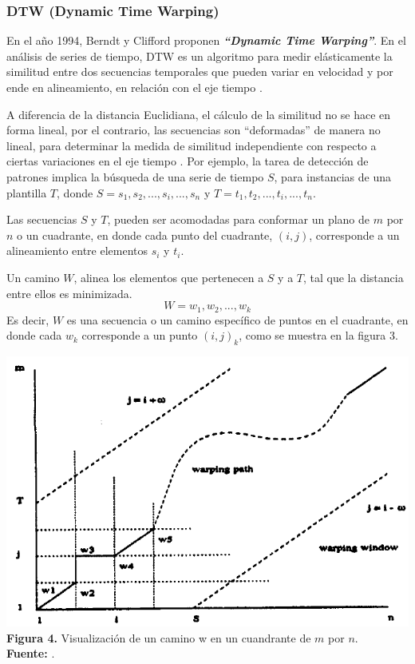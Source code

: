\subsubsection{DTW (Dynamic Time Warping)}
En el a\~no 1994, Berndt y Clifford \cite{dtw} proponen \textit{\textbf{\enquote{Dynamic Time Warping}}}. En el an\'alisis de series de tiempo, DTW es un algoritmo para medir el\'asticamente la similitud entre dos secuencias temporales que pueden variar en velocidad y por ende en alineamiento, en relaci\'on con el eje tiempo \cite{concepts}.\par A diferencia de la distancia Euclidiana, el c\'alculo de la similitud no se hace en forma lineal, por el contrario, las secuencias son \enquote{deformadas} de manera no li\-neal, para determinar la medida de similitud independiente con respecto a ciertas variaciones en el eje tiempo \cite{dtw}. Por ejemplo, la tarea de detecci\'on de patrones implica la b\'usqueda de una serie de tiempo $S$, para instancias de una plantilla $T$, donde $S = s_1, s_2, ..., s_i, ..., s_n$ y $T = t_1, t_2, ..., t_i, ..., t_n$.\par
Las secuencias $S$ y $T$, pueden ser acomodadas para conformar un plano de $m$ por $n$ o un cuadrante, en donde cada punto del cuadrante, $(i, j)$, corresponde a un alineamiento entre elementos $s_i$ y $t_i$.\par
Un camino $W$, alinea los elementos que pertenecen a $S$ y a $T$, tal que la distancia entre ellos es minimizada.\\
\begin{equation}
W = w_1, w_2, ..., w_k
\end{equation}
Es decir, $W$ es una secuencia o un camino espec\'ifico de puntos en el cuadrante, en donde cada $w_k$ corresponde a un punto $(i,j)_k$, como se muestra en la figura 3.
\begin{center}
\includegraphics[scale=0.7]{dtw.png}\\
\vspace*{10pt}
\footnotesize{\textbf{Figura 4.} Visualizaci\'on de un camino w en un cuandrante de $m$ por $n$.}\\ \textbf{Fuente:} \cite{dtw}.
\end{center}

